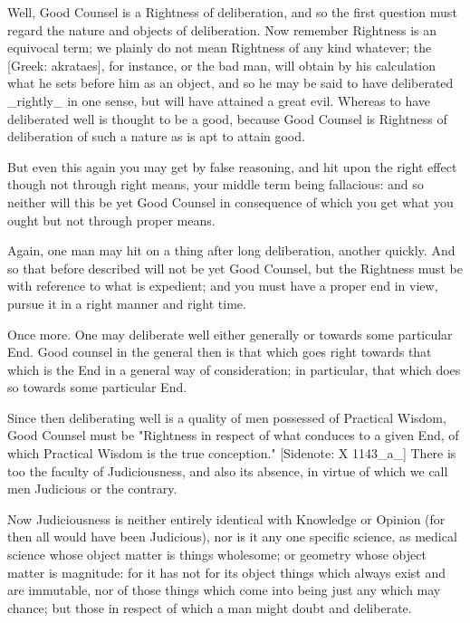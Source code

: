 Well, Good Counsel is a Rightness of deliberation, and so the first
question must regard the nature and objects of deliberation. Now
remember Rightness is an equivocal term; we plainly do not mean
Rightness of any kind whatever; the [Greek: akrataes], for instance, or
the bad man, will obtain by his calculation what he sets before him as
an object, and so he may be said to have deliberated _rightly_ in one
sense, but will have attained a great evil. Whereas to have deliberated
well is thought to be a good, because Good Counsel is Rightness of
deliberation of such a nature as is apt to attain good.

But even this again you may get by false reasoning, and hit upon the
right effect though not through right means, your middle term being
fallacious: and so neither will this be yet Good Counsel in consequence
of which you get what you ought but not through proper means.

Again, one man may hit on a thing after long deliberation, another
quickly. And so that before described will not be yet Good Counsel, but
the Rightness must be with reference to what is expedient; and you must
have a proper end in view, pursue it in a right manner and right time.

Once more. One may deliberate well either generally or towards some
particular End. Good counsel in the general then is that which goes
right towards that which is the End in a general way of consideration;
in particular, that which does so towards some particular End.

Since then deliberating well is a quality of men possessed of Practical
Wisdom, Good Counsel must be "Rightness in respect of what conduces to a
given End, of which Practical Wisdom is the true conception." [Sidenote:
X 1143_a_] There is too the faculty of Judiciousness, and also its
absence, in virtue of which we call men Judicious or the contrary.

Now Judiciousness is neither entirely identical with Knowledge or
Opinion (for then all would have been Judicious), nor is it any one
specific science, as medical science whose object matter is things
wholesome; or geometry whose object matter is magnitude: for it has not
for its object things which always exist and are immutable, nor of those
things which come into being just any which may chance; but those in
respect of which a man might doubt and deliberate.

